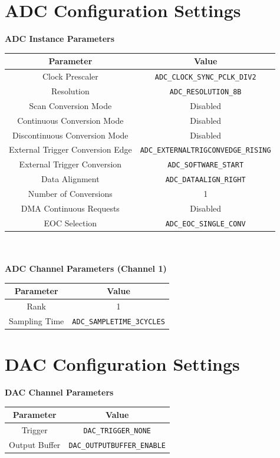 \documentclass[12pt]{report}
\begin{document}
\begin{appendix}
	\chapter{ADC Configuration Settings}\label{appendixadc}
	\textbf{ADC Instance Parameters}\\
	\begin{tabular}{|c|c|}
		\hline
		Parameter & Value\\\hline
		Clock Prescaler & \texttt{ADC\_CLOCK\_SYNC\_PCLK\_DIV2}\\\hline
		Resolution & \texttt{ADC\_RESOLUTION\_8B}\\\hline
		Scan Conversion Mode & Disabled\\\hline
		Continuous Conversion Mode & Disabled\\\hline
		Discontinuous Conversion Mode & Disabled\\\hline
		External Trigger Conversion Edge & \texttt{ADC\_EXTERNALTRIGCONVEDGE\_RISING}\\\hline
		External Trigger Conversion & \texttt{ADC\_SOFTWARE\_START}\\\hline
		Data Alignment & \texttt{ADC\_DATAALIGN\_RIGHT}\\\hline
		Number of Conversions & 1\\\hline
		DMA Continuous Requests & Disabled\\\hline
		EOC Selection & \texttt{ADC\_EOC\_SINGLE\_CONV}\\\hline
	\end{tabular}
	\newline
	\\\\
	\textbf{ADC Channel Parameters (Channel 1)}\\
	\begin{tabular}{|c|c|}
		\hline
		Parameter & Value\\\hline
		Rank & 1\\\hline
		Sampling Time & \texttt{ADC\_SAMPLETIME\_3CYCLES}\\\hline
	\end{tabular}
	\newpage
	\chapter{DAC Configuration Settings}\label{appendixdac}
	\textbf{DAC Channel Parameters}\\
	\begin{tabular}{|c|c|}
		\hline
		Parameter & Value\\\hline
		Trigger & \texttt{DAC\_TRIGGER\_NONE}\\\hline
		Output Buffer & \texttt{DAC\_OUTPUTBUFFER\_ENABLE}\\\hline
	\end{tabular}


\end{appendix}
\end{document}
